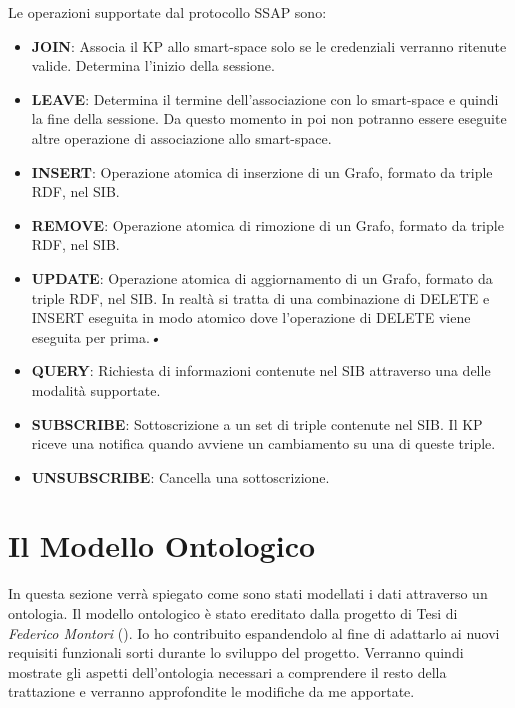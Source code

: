 Le operazioni supportate dal protocollo SSAP sono:

\begin{itemize}
	\item \textbf{JOIN}: Associa il KP allo smart-space solo se le credenziali verranno ritenute valide. Determina l'inizio della sessione.
	\item \textbf{LEAVE}: Determina il termine dell'associazione con lo smart-space e quindi la fine della sessione. Da questo momento in poi non potranno essere eseguite altre operazione di associazione allo smart-space.
	\item \textbf{INSERT}: Operazione atomica di inserzione di un Grafo, formato da triple RDF, nel SIB.
	\item \textbf{REMOVE}: Operazione atomica di rimozione di un Grafo, formato da triple RDF, nel SIB.
	\item \textbf{UPDATE}: Operazione atomica di aggiornamento di un Grafo, formato da triple RDF, nel SIB. In realtà si tratta di una combinazione di DELETE e INSERT eseguita in modo atomico dove l'operazione di DELETE viene eseguita per prima.\textsl{•}
	\item \textbf{QUERY}: Richiesta di informazioni contenute nel SIB attraverso una delle modalità supportate.
	\item \textbf{SUBSCRIBE}: Sottoscrizione a un set di triple contenute nel SIB. Il KP riceve una notifica quando avviene un cambiamento su una di queste triple.
	\item \textbf{UNSUBSCRIBE}: Cancella una sottoscrizione.
\end{itemize}


\section{Il Modello Ontologico}

In questa sezione verrà spiegato come sono stati modellati i dati attraverso un ontologia. Il modello ontologico è stato ereditato dalla progetto di Tesi di \emph{Federico Montori} (\cite{montori2012}). Io ho contribuito espandendolo al fine di adattarlo ai nuovi requisiti funzionali sorti durante lo sviluppo del progetto. Verranno quindi mostrate gli aspetti dell'ontologia necessari a comprendere il resto della trattazione e verranno approfondite le modifiche da me apportate.


